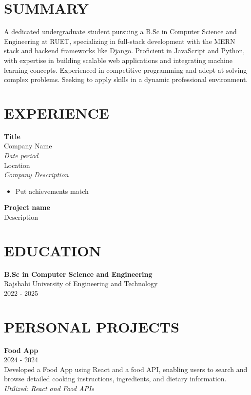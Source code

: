 \documentclass[a4paper,10pt]{article}
\begin{document}
\begin{multicols}{2}

\section*{SUMMARY}
A dedicated undergraduate student pursuing a B.Sc in Computer Science and Engineering at RUET, specializing in full-stack development with the MERN stack and backend frameworks like Django. Proficient in JavaScript and Python, with expertise in building scalable web applications and integrating machine learning concepts. Experienced in competitive programming and adept at solving complex problems. Seeking to apply skills in a dynamic professional environment.

\section*{EXPERIENCE}
\textbf{Title} \\
Company Name \\
\textit{Date period} \\
Location \\
\textit{Company Description} \\
\begin{itemize}[noitemsep]
    \item Put achievements match
\end{itemize}

\textbf{Project name} \\
Description

\section*{EDUCATION}
\textbf{B.Sc in Computer Science and Engineering} \\
Rajshahi University of Engineering and Technology \\
2022 - 2025

\section*{PERSONAL PROJECTS}
\textbf{Food App} \\
2024 - 2024 \\
Developed a Food App using React and a food API, enabling users to search and browse detailed cooking instructions, ingredients, and dietary information. \\
\textit{Utilized: React and Food APIs}


\end{multicols}
\end{document}
